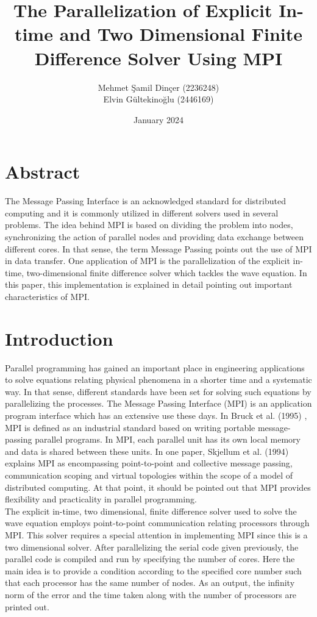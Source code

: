 \documentclass{article}
\title{The Parallelization of Explicit In-time and Two Dimensional Finite Difference Solver Using MPI}
\author{Mehmet Şamil Dinçer (2236248)\\
        Elvin Gültekinoğlu (2446169)}
\date{January 2024}
\begin{document}
\maketitle

\section{Abstract}

The Message Passing Interface is an acknowledged standard for distributed computing and it is commonly utilized in different solvers used in several problems. The idea behind MPI is based on dividing the problem into nodes, synchronizing the action of parallel nodes and providing data exchange between different cores. In that sense, the term Message Passing points out the use of MPI in data transfer. One application of MPI is the parallelization of the explicit in-time, two-dimensional finite difference solver which tackles the wave equation. In this paper, this implementation is explained in detail pointing out important characteristics of MPI. 
\clearpage

\section{Introduction}

Parallel programming has gained an important place in engineering applications to solve equations relating physical phenomena in a shorter time and a systematic way. In that sense, different standards have been set for solving such equations by parallelizing the processes. The Message Passing Interface (MPI) is an application program interface which has an extensive use these days. In Bruck et al. (1995) \cite{bruck1995efficient}, MPI is defined as an industrial standard based on writing portable message-passing parallel programs. In MPI, each parallel unit has its own local memory and data is shared between these units. In one paper, Skjellum et al. (1994) \cite{skjellum1994extending} explains MPI as encompassing point-to-point and collective message passing, communication scoping and virtual topologies within the scope of a model of distributed computing. At that point, it should be pointed out that MPI provides flexibility and practicality in parallel programming. \\

The explicit in-time, two dimensional, finite difference solver used to solve the wave equation employs point-to-point communication relating processors through MPI. This solver requires a special attention in implementing MPI since this is a two dimensional solver. After parallelizing the serial code given previously, the parallel code is compiled and run by specifying the number of cores. Here the main idea is to provide a condition according to the specified core number such that each processor has the same number of nodes. As an output, the infinity norm of the error and the time taken along with the number of processors are printed out. \\
\end{document}
